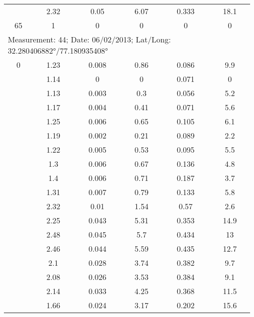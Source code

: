 \begin{longtable}{cccccc}
		& 2.32  & 0.05  & 6.07  & 0.333 & 18.1 \\
		65    & 1     & 0     & 0     & 0     & 0 \\ 	
		\midrule
		\multicolumn{6}{l}{Measurement: 44; Date: 06/02/2013;
			Lat/Long: 32.280406882°/77.180935408°} \\		
		\midrule
		0     & 1.23  & 0.008 & 0.86  & 0.086 & 9.9 \\
		
		& 1.14  & 0     & 0     & 0.071 & 0 \\
		
		& 1.13  & 0.003 & 0.3   & 0.056 & 5.2 \\
		
		& 1.17  & 0.004 & 0.41  & 0.071 & 5.6 \\
		
		& 1.25  & 0.006 & 0.65  & 0.105 & 6.1 \\
		
		& 1.19  & 0.002 & 0.21  & 0.089 & 2.2 \\
		
		& 1.22  & 0.005 & 0.53  & 0.095 & 5.5 \\
		
		& 1.3   & 0.006 & 0.67  & 0.136 & 4.8 \\
		
		& 1.4   & 0.006 & 0.71  & 0.187 & 3.7 \\
		
		& 1.31  & 0.007 & 0.79  & 0.133 & 5.8 \\
		
		& 2.32  & 0.01  & 1.54  & 0.57  & 2.6 \\
		
		& 2.25  & 0.043 & 5.31  & 0.353 & 14.9 \\
		
		& 2.48  & 0.045 & 5.7   & 0.434 & 13 \\
		
		& 2.46  & 0.044 & 5.59  & 0.435 & 12.7 \\
		
		& 2.1   & 0.028 & 3.74  & 0.382 & 9.7 \\
		
		& 2.08  & 0.026 & 3.53  & 0.384 & 9.1 \\
		
		& 2.14  & 0.033 & 4.25  & 0.368 & 11.5 \\
		
		& 1.66  & 0.024 & 3.17  & 0.202 & 15.6 \\
		

\end{longtable}
